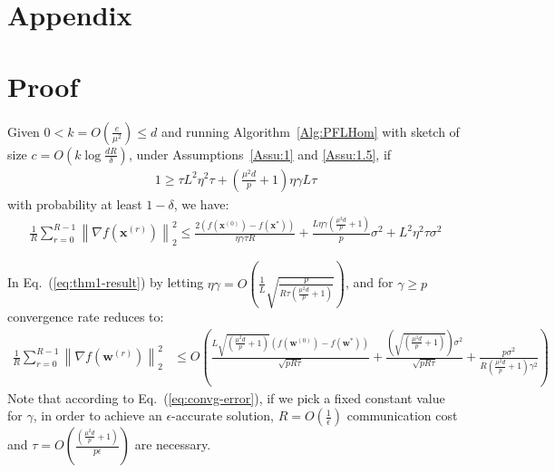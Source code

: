 \section{Appendix}
\section{Proof}
\begin{theorem}
Given $0<k=O\left(\frac{e}{\mu^2}\right)\leq d$
and running Algorithm~\ref{Alg:PFLHom} with sketch of size $c=O\left(k\log \frac{d R}{\delta}\right)$,  under Assumptions~\ref{Assu:1} and \ref{Assu:1.5}, if 
\begin{align}
   1\geq {\tau L^2\eta^2\tau}+(\frac{\mu^2 d}{p}+1)\eta\gamma L{\tau}\label{eq:cnd-lrs-h} 
\end{align}
with probability at least $1-\delta$, we have:
\begin{align}\label{eq:thm1-result}
    \frac{1}{R}\sum_{r=0}^{R-1}\left\|\nabla f({\boldsymbol{x}}^{(r)})\right\|_2^2\leq \frac{2\left(f(\boldsymbol{x}^{(0)})-f(\boldsymbol{x}^{*})\right)}{\eta\gamma\tau R}+\frac{L\eta\gamma(\frac{\mu^2 d}{p}+1)}{p}\sigma^2+{L^2\eta^2\tau }\sigma^2
\end{align}
\end{theorem}


\begin{corollary} 
In Eq.~(\ref{eq:thm1-result}) by letting $\eta\gamma=O\left(\frac{1}{L}\sqrt{\frac{p}{R\tau\left(\frac{\mu^2 d}{p}+1\right)}}\right)$, and for $\gamma\geq p$  convergence rate reduces to:
\begin{align}
    \frac{1}{R}\sum_{r=0}^{R-1}\left\|\nabla f({\boldsymbol{w}}^{(r)})\right\|_2^2&\leq O\left(\frac{L\sqrt{\left(\frac{\mu^2 d}{p}+1\right)}\left(f(\boldsymbol{w}^{(0)})-f(\boldsymbol{w}^{*})\right)}{\sqrt{pR\tau}}+\frac{\left(\sqrt{\left(\frac{\mu^2 d}{p}+1\right)}\right)\sigma^2}{\sqrt{pR\tau}}+\frac{p\sigma^2}{R\left(\frac{\mu^2 d}{p}+1\right)\gamma^2}\right)\label{eq:convg-error}
\end{align}
Note that according to Eq.~(\ref{eq:convg-error}), if we pick  a fixed constant value for  $\gamma$, in order to achieve an $\epsilon$-accurate solution, $R=O\left(\frac{1}{\epsilon}\right)$ communication cost and $\tau=O\left(\frac{\left(\frac{\mu^2 d}{p}+1\right)}{p\epsilon}\right)$ are necessary.

\end{corollary}




